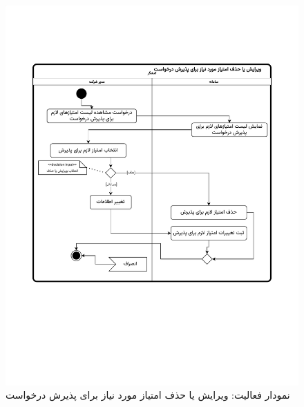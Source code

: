 \begin{figure}[ht!]
	\centering
	\includegraphics[scale=0.8, page=1]{figs/OOD-activity-editreqscore.pdf}
	\caption{نمودار فعالیت: ویرایش یا حذف امتیاز مورد نیاز برای پذیرش درخواست}
\end{figure}
\FloatBarrier
\newpage


